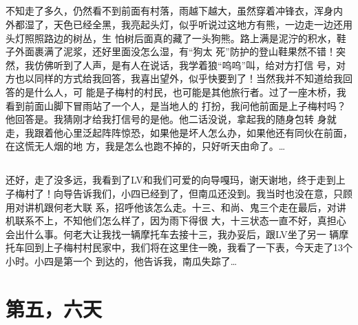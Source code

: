 ﻿\documentclass[hyperref={bookmarks=ture}xcolor=pdflatex,svgnames,table,compress]{beamer}
\begin{document}
\subsection{}
\begin{frame}
  \begin{ztebox} {\footnotesize 不知走了多久，仍然看不到前面有村落，雨越下越大，虽然穿着冲锋衣，浑身内
      外都湿了，天色已经全黑，我亮起头灯，似乎听说过这地方有熊，一边走一边还用头灯照照路边的树丛，生
      怕树后面真的藏了一头狗熊。路上满是泥泞的积水，鞋子外面裹满了泥浆，还好里面没怎么湿，有“狗太
      死”防护的登山鞋果然不错！突然，我仿佛听到了人声，是有人在说话，我学着狼“呜呜”叫，给对方打信
      号，对方也以同样的方式给我回答，我喜出望外，似乎快要到了！当然我并不知道给我回答的是什么人，可
      能是子梅村的村民，也可能是其他旅行者。过了一座木桥，我看到前面山脚下冒雨站了一个人，是当地人的
      打扮，我问他前面是上子梅村吗？他回答是。我猜刚才给我打信号的是他。他二话没说，拿起我的随身包转
      身就走，我跟着他心里泛起阵阵惊恐，如果他是坏人怎么办，如果他还有同伙在前面，在这慌无人烟的地
      方，我是怎么也跑不掉的，只好听天由命了。\ldots }
\end{ztebox}
\end{frame}

\subsection{}
\begin{frame}
  \begin{ztebox} {\footnotesize 还好，走了没多远，我看到了LV和我们可爱的向导嘎玛，谢天谢地，终于走到上
      子梅村了！向导告诉我们，小四已经到了，但南瓜还没到。我当时也没在意，只顾用对讲机跟何老大联
      系，招呼他该怎么走。十三、和尚、鬼三个走在最后，对讲机联系不上，不知他们怎么样了，因为雨下得很
      大，十三状态一直不好，真担心会出什么事。何老大让我找一辆摩托车去接十三，我办妥后，跟LV坐了另一
      辆摩托车回到上子梅村村民家中，我们将在这里住一晚，我看了一下表，今天走了13个小时。小四是第一个
      到达的，他告诉我，南瓜失踪了\ldots }
\end{ztebox}
\end{frame}


\section{第五，六天}
\end{document}
